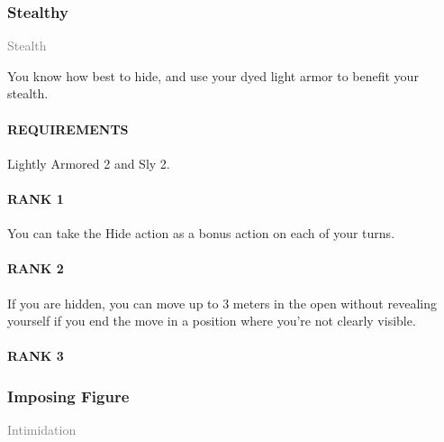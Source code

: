 
\subsubsection{Stealthy} \label{feat::stealthy}
\small{\textcolor{gray}{Stealth}}

\normalsize
You know how best to hide, and use your dyed light armor to benefit your stealth.
\paragraph{REQUIREMENTS} Lightly Armored 2 and Sly 2.
\paragraph{RANK 1} You can take the Hide action as a bonus action on each of your turns.
\paragraph{RANK 2} If you are hidden, you can move up to 3 meters in the open without revealing yourself if you end the move in a position where you're not clearly visible.
\paragraph{RANK 3}

\subsubsection{Imposing Figure} \label{feat::imposingfigure}
\small{\textcolor{gray}{Intimidation}}


